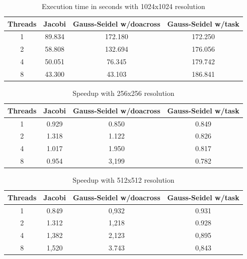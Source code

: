 \documentclass[titlepage]{article}
\begin{document}
\begin{table}[H]
\begin{center}
    \begin{tabular}{ |c|c|c|c| } 
     \hline
     \bfseries{Threads} & \bfseries{Jacobi} &
     \bfseries{Gauss-Seidel w/doacross} &
     \bfseries{Gauss-Seidel w/task} \\
     \hline
     1 & 89.834 & 172.180 & 172.250 \\
     2 & 58.808 & 132.694 & 176.056 \\ 
     4 & 50.051 & 76.345 & 179.742 \\ 
     8 & 43.300 & 43.103 & 186.841 \\ 
     \hline
    \end{tabular}
\end{center}
\caption{Execution time in seconds with 1024x1024 resolution}
\end{table}

\begin{table}[H]
\begin{center}
    \begin{tabular}{ |c|c|c|c| } 
     \hline
     \bfseries{Threads} & \bfseries{Jacobi} &
     \bfseries{Gauss-Seidel w/doacross} &
     \bfseries{Gauss-Seidel w/task} \\
     \hline
     1 & 0.929 & 0.850 & 0.849 \\
     2 & 1.318 & 1.122 & 0.826 \\ 
     4 & 1.017 & 1.950 & 0.817 \\ 
     8 & 0.954 & 3,199 & 0.782 \\ 
     \hline
    \end{tabular}
\end{center}
\caption{Speedup with 256x256 resolution}
\end{table}
 
\begin{table}[H]
\begin{center}
    \begin{tabular}{ |c|c|c|c| } 
     \hline
     \bfseries{Threads} & \bfseries{Jacobi} &
     \bfseries{Gauss-Seidel w/doacross} &
     \bfseries{Gauss-Seidel w/task} \\
     \hline
     1 & 0.849 & 0,932 & 0.931 \\
     2 & 1.312 & 1,218 & 0.928 \\ 
     4 & 1,382 & 2,123 & 0,895 \\ 
     8 & 1,520 & 3.743 & 0,843 \\ 
     \hline
    \end{tabular}
\end{center}
\caption{Speedup with 512x512 resolution}
\end{table}
\end{document}
